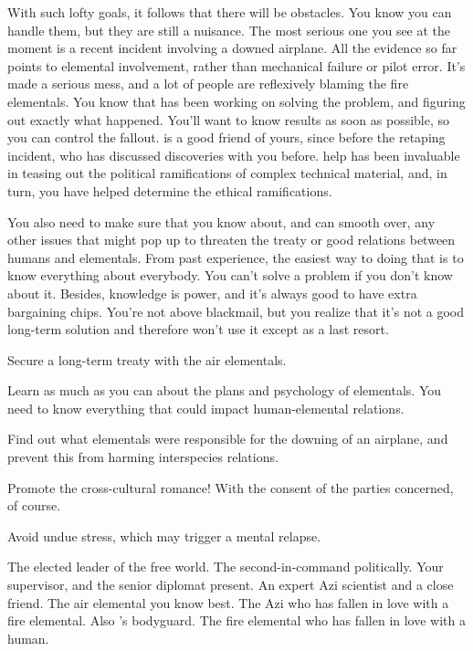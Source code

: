 \documentclass[char]{elementals}
\begin{document}
With such lofty goals, it follows that there will be obstacles.  You know you can handle them, but they are still a nuisance.  The most serious one you see at the moment is a recent incident involving a downed airplane.  All the evidence so far points to elemental involvement, rather than mechanical failure or pilot error.  It's made a serious mess, and a lot of people are reflexively blaming the fire elementals.  You know that \cScientist{\intro} has been working on solving the problem, and figuring out exactly what happened.  You'll want to know \cScientist{\their} results as soon as possible, so you can control the fallout.  \cScientist{} is a good friend of yours, since before the retaping incident, who has discussed \cScientist{\their} discoveries with you before.  \cScientist{\Their} help has been invaluable in teasing out the political ramifications of complex technical material, and, in turn, you have helped \cScientist{} determine the ethical ramifications.


You also need to make sure that you know about, and can smooth over, any other issues that might pop up to threaten the treaty or good relations between humans and elementals.  From past experience, the easiest way to doing that is to know everything about everybody.  You can't solve a problem if you don't know about it.  Besides, knowledge is power, and it's always good to have extra bargaining chips.  You're not above blackmail, but you realize that it's not a good long-term solution and therefore won't use it except as a last resort.

\begin{itemz}[Goals]
	\item  Secure a long-term treaty with the air elementals.
	\item  Learn as much as you can about the plans and psychology of elementals.  You need to know everything that could impact human-elemental relations.
	\item  Find out what elementals were responsible for the downing of an airplane, and prevent this from harming interspecies relations.
	\item  Promote the cross-cultural romance!  With the consent of the parties concerned, of course.
	\item  Avoid undue stress, which may trigger a mental relapse.
\end{itemz}

\begin{contacts}
	\contact{\cLeader{}}  The elected leader of the free world.
	\contact{\cDema{}}  The second-in-command politically.
	\contact{\cAvatar{}}  Your supervisor, and the senior diplomat present.
	\contact{\cScientist{}}  An expert Azi scientist and a close friend.
	\contact{\cNaturalist{}}  The air elemental you know best. 
	\contact{\cRomeo{}}  The Azi who has fallen in love with a fire elemental.  Also \cLeader{}'s bodyguard.
	\contact{\cJuliet{}}  The fire elemental who has fallen in love with a human.
\end{contacts}
\end{document}

